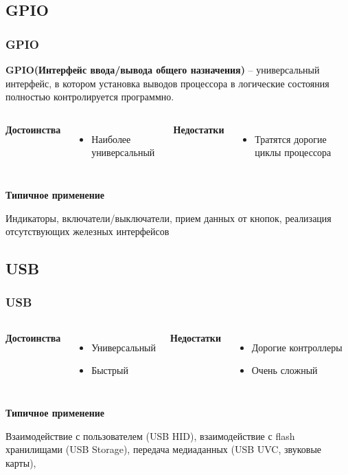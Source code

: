 \subsection{GPIO}
\begin{frame}
  \frametitle{GPIO}
  \textbf{GPIO(Интерфейс ввода/вывода общего назначения)} -- универсальный интерфейс, в котором установка выводов процессора в логические состояния полностью контролируется программно.
  

  \begin{columns}
    \column{4cm}
    \begin{center}
      {\bf\large Достоинства}
    \end{center}
    \begin{itemize}
       \item Наиболее универсальный
    \end{itemize}
    \column{4cm}
    \begin{center}
      {\bf\large Недостатки}
    \end{center}
    \begin{itemize}
       \item Тратятся дорогие циклы процессора
    \end{itemize}
  \end{columns}
  \begin{center}
    {\bf\large Типичное применение}
  \end{center}
  Индикаторы, включатели/выключатели, прием данных от кнопок, реализация отсутствующих железных интерфейсов

\end{frame}
\subsection{USB}
\begin{frame}
  \frametitle{USB}
  \begin{columns}
    \column{4cm}
    \begin{center}
      {\bf\large Достоинства}
    \end{center}
    \begin{itemize}
       \item Универсальный
       \item Быстрый
    \end{itemize}
    \column{4cm}
    \begin{center}
      {\bf\large Недостатки}
    \end{center}
    \begin{itemize}
       \item Дорогие контроллеры
       \item Очень сложный
    \end{itemize}
  \end{columns}
  \begin{center}
    {\bf\large Типичное применение}
  \end{center}
  Взаимодействие с пользователем (USB HID), взаимодействие с flash хранилищами (USB Storage), передача медиаданных (USB UVC, звуковые карты), 
\end{frame}
